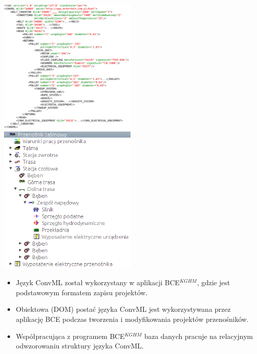 \documentclass{beamer}
\begin{document}
\begin{frame}
\begin{center}
\includegraphics[width=0.5\textwidth]{beamer/Zaznaczenie_026}
\pause
\includegraphics[width=0.5\textwidth]{beamer/Zaznaczenie_024}
\end{center}
\end{frame}

\begin{frame}
\begin{itemize}
\item Język ConvML został wykorzystany w aplikacji BCE$^{KGHM}$,
  gdzie jest podstawowym formatem zapisu projektów.

\item Obiektowa (DOM) postać języka ConvML jest wykorzystywana przez
  aplikację BCE podczas tworzenia i modyfikowania projektów
  przenośników.

\item Współpracująca z programem BCE$^{KGHM}$ baza danych pracuje
  na relacyjnym odwzorowaniu struktury języka ConvML.
\end{itemize}
\end{frame}
\end{document}
